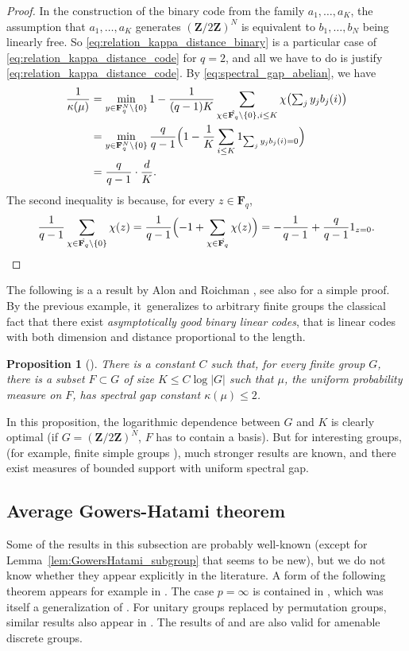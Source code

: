 \documentclass[JEP,XML,SOM,Unicode,published]{cedram}
\let\ts\textstyle
\theoremstyle{plain}
\newtheorem{proposition}[theorem]{Proposition}
\theoremstyle{definition}
\newcommand{\Z}{\mathbf{Z}}
\newcommand{\F}{\mathbf{F}}
\begin{document}
\begin{proof} In the construction of the binary code from the family $a_1,\dots,a_K$, the assumption that $a_1,\dots,a_K$ generates $(\Z/2\Z)^N$ is equivalent to $b_1,\dots,b_N$ being linearly free. So \eqref{eq:relation_kappa_distance_binary} is a particular case of \eqref{eq:relation_kappa_distance_code} for $q=2$, and all we have to do is justify \eqref{eq:relation_kappa_distance_code}. By \eqref{eq:spectral_gap_abelian}, we have
\begin{align*}
\frac{1}{\kappa(\mu)}& =\min_{y \in \F_q^N\setminus\{0\}}1-\frac{1}{(q-1)K} \sum_{\chi \in\hat{\F_q}\setminus\{0\}, i\leq K} \chi\bigl(\ts\sum_j y_j b_j(i)\bigr)\\
& =\min_{y \in \F_q^N\setminus\{0\}}\frac{q}{q-1}\Bigl(1-\frac{1}{K} \sum_{i\leq K} 1_{\sum_j y_j b_j(i)=0}\Bigr)\\
& =\frac{q}{q-1}\cdot\frac{d}{K}.
\end{align*}
The second inequality is because, for every $z \in\F_q$,
\[
\frac{1}{q-1} \sum_{\chi \in\hat{\F_q}\setminus\{0\}} \chi(z) = \frac{1}{q-1}\Bigl(-1+\sum_{\chi \in\hat{\F_q}}\chi(z)\Bigr) = -\frac{1}{q-1} +\frac{q}{q-1} 1_{z=0}.\qedhere
\]
\end{proof}

The following is a a result by Alon and Roichman \cite{MR1262979}, see also \cite{MR2097328} for a simple proof. By the previous example, it~generalizes to arbitrary finite groups the classical fact that there exist \emph{asymptotically good binary linear codes}, that is linear codes with both dimension and distance proportional to the length.

\begin{proposition}[\cite{MR1262979}]\label{prop:measure_with_small_support_and_small_Fourier_transform_nonabelian} There is a constant $C$ such that, for every finite group $G$, there is a subset $F \subset G$ of size $K\leq C \log |G|$ such that $\mu$, the uniform probability measure on $F$, has spectral gap constant $\kappa(\mu)\leq 2$.
\end{proposition}
In this proposition, the logarithmic dependence between $G$ and $K$ is clearly optimal (if $G=(\Z/2\Z)^N$, $F$ has to contain a basis). But for interesting groups, (for example, finite simple groups \cite{MR2221038}), much stronger results are known, and there exist measures of bounded support with uniform spectral gap.

\subsection{Average Gowers-Hatami theorem}
Some of the results in this subsection are probably well-known (except for Lemma~\ref{lem:GowersHatami_subgroup} that seems to be new), but we do not know whether they appear explicitly in the literature. A form of the following theorem appears for example in \cite{vidickPauliBraiding}. The case $p=\infty$ is contained in \cite{MR3867328}, which was itself a generalization of \cite{MR3733361}. For unitary groups replaced by permutation groups, similar results also appear in \cite{beckerChapman}. The results of \cite{MR3867328} and \cite{beckerChapman} are also valid for amenable discrete groups.
\end{document}
